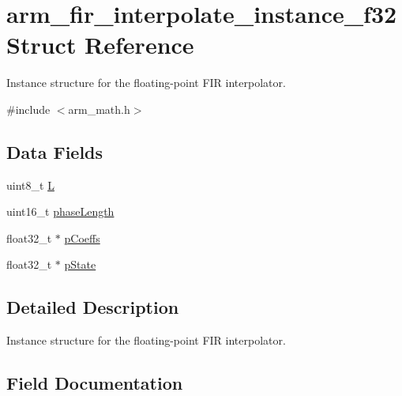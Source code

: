\hypertarget{structarm__fir__interpolate__instance__f32}{}\section{arm\+\_\+fir\+\_\+interpolate\+\_\+instance\+\_\+f32 Struct Reference}
\label{structarm__fir__interpolate__instance__f32}


Instance structure for the floating-\/point F\+IR interpolator.  




{\ttfamily \#include $<$arm\+\_\+math.\+h$>$}

\subsection*{Data Fields}
\begin{DoxyCompactItemize}
\item 
uint8\+\_\+t \hyperlink{structarm__fir__interpolate__instance__f32_aee73cc056696e504430c53eaa9c58cf0}{L}
\item 
uint16\+\_\+t \hyperlink{structarm__fir__interpolate__instance__f32_a8f92bb07e0812f94679438cdf412b26a}{phase\+Length}
\item 
float32\+\_\+t $\ast$ \hyperlink{structarm__fir__interpolate__instance__f32_aacbb8dd8eeba4b21fc2bb40076405ee3}{p\+Coeffs}
\item 
float32\+\_\+t $\ast$ \hyperlink{structarm__fir__interpolate__instance__f32_a335c87e6fdc4b96601d95a5de8b9c463}{p\+State}
\end{DoxyCompactItemize}


\subsection{Detailed Description}
Instance structure for the floating-\/point F\+IR interpolator. 

\subsection{Field Documentation}
\mbox{\label{structarm__fir__interpolate__instance__f32_aee73cc056696e504430c53eaa9c58cf0}} 

